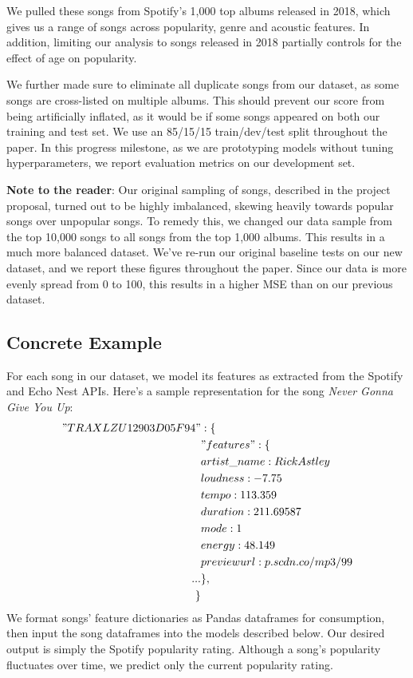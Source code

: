 \documentclass[journal]{IEEEtran}
\begin{document}
We pulled these songs from Spotify's 1,000 top albums released in 2018, which gives us a range of songs across popularity, genre and acoustic features. In addition, limiting our analysis to songs released in 2018 partially controls for the effect of age on popularity.

We further made sure to eliminate all duplicate songs from our dataset, as some songs are cross-listed on multiple albums. This should prevent our score from being artificially inflated, as it would be if some songs appeared on both our training and test set. We use an 85/15/15 train/dev/test split throughout the paper. In this progress milestone, as we are prototyping models without tuning hyperparameters, we report evaluation metrics on our development set.

\textbf{Note to the reader}: Our original sampling of songs, described in the project proposal, turned out to be highly imbalanced, skewing heavily towards popular songs over unpopular songs. To remedy this, we changed our data sample from the top 10,000 songs to all songs from the top 1,000 albums. This results in a much more balanced dataset. We've re-run our original baseline tests on our new dataset, and we report these figures throughout the paper. Since our data is more evenly spread from 0 to 100, this results in a higher MSE than on our previous dataset.

\subsection{Concrete Example}
For each song in our dataset, we model its features as extracted from the Spotify and Echo Nest APIs. Here's a sample representation for the song \textit{Never Gonna Give You Up}:
\begin{align*}
    "TRAXLZU12903D05F94 "&: \{ \\
  &"features": \{\\
  &artist\_name: Rick Astley \\
  &loudness: -7.75 \\
  &tempo: 113.359 \\
  &duration: 211.69587 \\
  &mode: 1 \\
  &energy: 48.149 \\
  &previewurl: p.scdn.co/mp3/99 \\
  ...
        &\},\\
    \}
\end{align*}
We format songs' feature dictionaries as Pandas dataframes for consumption, then input the song dataframes into the models described below. Our desired output is simply the Spotify popularity rating. Although a song's popularity fluctuates over time, we predict only the current popularity rating.
\end{document}
